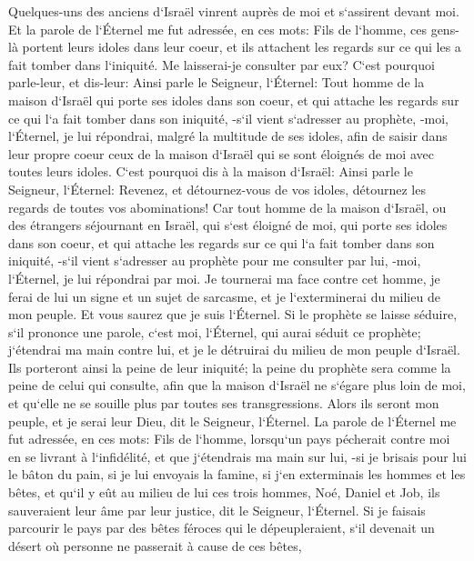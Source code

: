 \verse Quelques-uns des anciens d`Israël vinrent auprès de moi et s`assirent devant moi. 
\verse Et la parole de l`Éternel me fut adressée, en ces mots: 
\verse Fils de l`homme, ces gens-là portent leurs idoles dans leur coeur, et ils attachent les regards sur ce qui les a fait tomber dans l`iniquité. Me laisserai-je consulter par eux? 
\verse C`est pourquoi parle-leur, et dis-leur: Ainsi parle le Seigneur, l`Éternel: Tout homme de la maison d`Israël qui porte ses idoles dans son coeur, et qui attache les regards sur ce qui l`a fait tomber dans son iniquité, -s`il vient s`adresser au prophète, -moi, l`Éternel, je lui répondrai, malgré la multitude de ses idoles, 
\verse afin de saisir dans leur propre coeur ceux de la maison d`Israël qui se sont éloignés de moi avec toutes leurs idoles. 
\verse C`est pourquoi dis à la maison d`Israël: Ainsi parle le Seigneur, l`Éternel: Revenez, et détournez-vous de vos idoles, détournez les regards de toutes vos abominations! 
\verse Car tout homme de la maison d`Israël, ou des étrangers séjournant en Israël, qui s`est éloigné de moi, qui porte ses idoles dans son coeur, et qui attache les regards sur ce qui l`a fait tomber dans son iniquité, -s`il vient s`adresser au prophète pour me consulter par lui, -moi, l`Éternel, je lui répondrai par moi. 
\verse Je tournerai ma face contre cet homme, je ferai de lui un signe et un sujet de sarcasme, et je l`exterminerai du milieu de mon peuple. Et vous saurez que je suis l`Éternel. 
\verse Si le prophète se laisse séduire, s`il prononce une parole, c`est moi, l`Éternel, qui aurai séduit ce prophète; j`étendrai ma main contre lui, et je le détruirai du milieu de mon peuple d`Israël. 
\verse Ils porteront ainsi la peine de leur iniquité; la peine du prophète sera comme la peine de celui qui consulte, 
\verse afin que la maison d`Israël ne s`égare plus loin de moi, et qu`elle ne se souille plus par toutes ses transgressions. Alors ils seront mon peuple, et je serai leur Dieu, dit le Seigneur, l`Éternel. 
\verse La parole de l`Éternel me fut adressée, en ces mots: 
\verse Fils de l`homme, lorsqu`un pays pécherait contre moi en se livrant à l`infidélité, et que j`étendrais ma main sur lui, -si je brisais pour lui le bâton du pain, si je lui envoyais la famine, si j`en exterminais les hommes et les bêtes, 
\verse et qu`il y eût au milieu de lui ces trois hommes, Noé, Daniel et Job, ils sauveraient leur âme par leur justice, dit le Seigneur, l`Éternel. 
\verse Si je faisais parcourir le pays par des bêtes féroces qui le dépeupleraient, s`il devenait un désert où personne ne passerait à cause de ces bêtes, 
